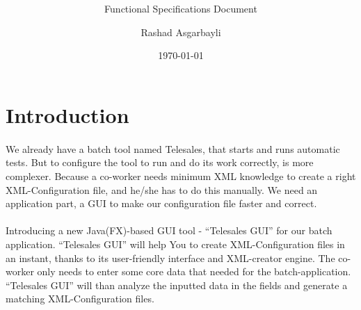 \documentclass[hidelinks, a4paper, 11pt]{scrartcl}
\author{Rashad Asgarbayli}
\title{\vspace{3cm}
\app\vspace{20mm}}
\subtitle{Functional Specifications Document}
\date{\today}
\def\app{``Telesales GUI''}
\begin{document}
\maketitle
\thispagestyle{empty}

\newpage

\tableofcontents

\newpage


\section{Introduction}

\paragraph{}We already have a batch tool named Telesales, that starts and runs automatic tests. But to configure the tool to run and do its work correctly, is more complexer. Because a co-worker needs minimum XML knowledge to create a right XML-Configuration file, and he/she has to do this manually. We need an application part, a GUI to make our configuration file faster and correct.
\paragraph{}Introducing a new Java(FX)-based GUI tool - \app{} for our batch application. \app{} will help You to create XML-Configuration files in an instant, thanks to its user-friendly interface and XML-creator engine. The co-worker only needs to enter some core data that needed for the batch-application. \app{} will than analyze the inputted data in the fields and generate a matching XML-Configuration files.




















\end{document}
